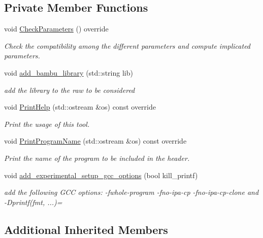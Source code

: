 \subsection*{Private Member Functions}
\begin{DoxyCompactItemize}
\item 
void \hyperlink{classBambuParameter_aa1f5172814a5b7937b261509db53da9d}{Check\+Parameters} () override
\begin{DoxyCompactList}\small\item\em Check the compatibility among the different parameters and compute implicated parameters. \end{DoxyCompactList}\item 
void \hyperlink{classBambuParameter_a82c89009ec3e4df0e56d530ea3caf470}{add\+\_\+bambu\+\_\+library} (std\+::string lib)
\begin{DoxyCompactList}\small\item\em add the library to the raw to be considered \end{DoxyCompactList}\item 
void \hyperlink{classBambuParameter_a1bdb53362203ada5ee2dc62f66e4bae8}{Print\+Help} (std\+::ostream \&os) const override
\begin{DoxyCompactList}\small\item\em Print the usage of this tool. \end{DoxyCompactList}\item 
void \hyperlink{classBambuParameter_a7e11c45aaee781a23dbc3850f8a682e1}{Print\+Program\+Name} (std\+::ostream \&os) const override
\begin{DoxyCompactList}\small\item\em Print the name of the program to be included in the header. \end{DoxyCompactList}\item 
void \hyperlink{classBambuParameter_a28ac4c15cb64b71afc19f96caecd9c26}{add\+\_\+experimental\+\_\+setup\+\_\+gcc\+\_\+options} (bool kill\+\_\+printf)
\begin{DoxyCompactList}\small\item\em add the following G\+CC options\+: -\/fwhole-\/program -\/fno-\/ipa-\/cp -\/fno-\/ipa-\/cp-\/clone and -\/D\textquotesingle{}printf(fmt, ...)=\textquotesingle{} \end{DoxyCompactList}\end{DoxyCompactItemize}
\subsection*{Additional Inherited Members}


